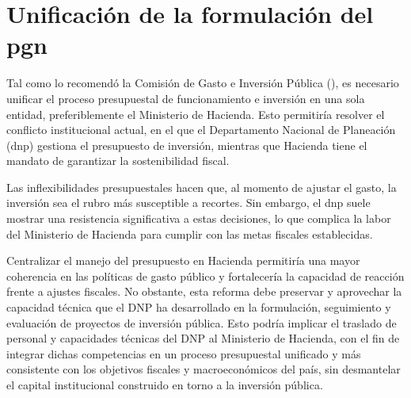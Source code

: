 \section{Unificación de la formulación del \gls{pgn}}

Tal como lo recomendó la Comisión de Gasto e Inversión Pública (\cite{comisiongasto2017}), es necesario unificar el proceso presupuestal de funcionamiento e inversión en una sola entidad, preferiblemente el Ministerio de Hacienda. Esto permitiría resolver el conflicto institucional actual, en el que el Departamento Nacional de Planeación (\gls{dnp}) gestiona el presupuesto de inversión, mientras que Hacienda tiene el mandato de garantizar la sostenibilidad fiscal.

Las inflexibilidades presupuestales hacen que, al momento de ajustar el gasto, la inversión sea el rubro más susceptible a recortes. Sin embargo, el \gls{dnp} suele mostrar una resistencia significativa a estas decisiones, lo que complica la labor del Ministerio de Hacienda para cumplir con las metas fiscales establecidas.


Centralizar el manejo del presupuesto en Hacienda permitiría una mayor coherencia en las políticas de gasto público y fortalecería la capacidad de reacción frente a ajustes fiscales. No obstante, esta reforma debe preservar y aprovechar la capacidad técnica que el DNP ha desarrollado en la formulación, seguimiento y evaluación de proyectos de inversión pública. Esto podría implicar el traslado de personal y capacidades técnicas del DNP al Ministerio de Hacienda, con el fin de integrar dichas competencias en un proceso presupuestal unificado y más consistente con los objetivos fiscales y macroeconómicos del país, sin desmantelar el capital institucional construido en torno a la inversión pública.



